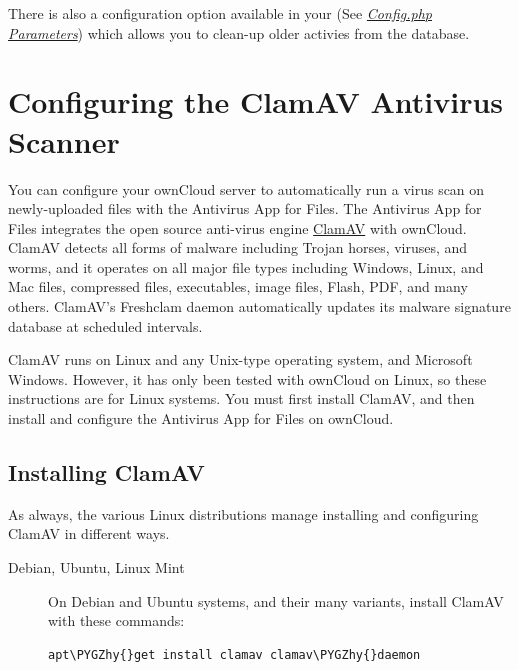 \documentclass[letterpaper,10pt,english]{sphinxmanual}
\def\PYGZhy{\char`\-}
\begin{document}
There is also a configuration option  available in your
 (See {\hyperref[configuration_server/config_sample_php_parameters::doc]{\emph{Config.php Parameters}}}) which allows
you to clean-up older activies from the database.


\section{Configuring the ClamAV Antivirus Scanner}
\label{configuration_server/antivirus_configuration::doc}\label{configuration_server/antivirus_configuration:configuring-the-clamav-antivirus-scanner}
You can configure your ownCloud server to automatically run a virus scan on
newly-uploaded files with the Antivirus App for Files. The Antivirus App for
Files integrates the open source anti-virus engine \href{http://www.clamav.net/index.html}{ClamAV}  with ownCloud. ClamAV detects all forms
of malware including Trojan horses, viruses, and worms, and it operates on all
major file types including Windows, Linux, and Mac files, compressed files,
executables, image files, Flash, PDF, and many others. ClamAV's Freshclam
daemon automatically updates its malware signature database at scheduled
intervals.

ClamAV runs on Linux and any Unix-type operating system, and Microsoft Windows.
However, it has only been tested with ownCloud on Linux, so these instructions
are for Linux systems. You must first install ClamAV, and then install and
configure the Antivirus App for Files on ownCloud.


\subsection{Installing ClamAV}
\label{configuration_server/antivirus_configuration:installing-clamav}
As always, the various Linux distributions manage installing and configuring
ClamAV in different ways.
\begin{description}
\item[{Debian, Ubuntu, Linux Mint}] \leavevmode
On Debian and Ubuntu systems, and their many variants, install ClamAV with
these commands:

\begin{Verbatim}[commandchars=\\\{\}]
apt\PYGZhy{}get install clamav clamav\PYGZhy{}daemon
\end{Verbatim}

\end{description}
\end{document}
